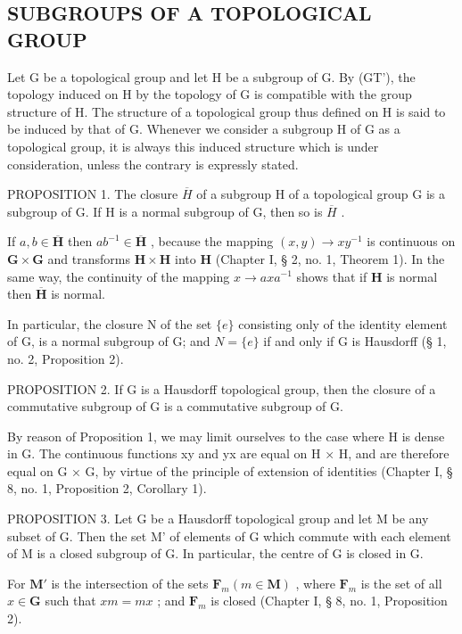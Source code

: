 \subsection{SUBGROUPS OF A TOPOLOGICAL GROUP}

Let G be a topological group and let H be a subgroup of G. By (GT'), the topology induced on H by the topology of G is compatible with the group structure of H. The structure of a topological group thus defined on H is said to be induced by that of G. Whenever we consider a subgroup H of G as a topological group, it is always this induced structure which is under consideration, unless the contrary is expressly stated.

PROPOSITION 1. The closure \(\overline{H}\) of a subgroup H of a topological group G is a subgroup of G. If H is a normal subgroup of G, then so is \(\overline{H}\) .

If \(a, b \in \overline{\mathbf{H}}\) then \(ab^{-1} \in \overline{\mathbf{H}}\) , because the mapping \((x, y) \to xy^{-1}\) is continuous on \(\mathbf{G} \times \mathbf{G}\) and transforms \(\mathbf{H} \times \mathbf{H}\) into \(\mathbf{H}\) (Chapter I, § 2, no. 1, Theorem 1). In the same way, the continuity of the mapping \(x \to axa^{-1}\) shows that if \(\mathbf{H}\) is normal then \(\overline{\mathbf{H}}\) is normal.

In particular, the closure N of the set \(\{e\}\) consisting only of the identity element of G, is a normal subgroup of G; and \(N=\{e\}\) if and only if G is Hausdorff (§ 1, no. 2, Proposition 2).

PROPOSITION 2. If G is a Hausdorff topological group, then the closure of a commutative subgroup of G is a commutative subgroup of G.

By reason of Proposition 1, we may limit ourselves to the case where H is dense in G. The continuous functions xy and yx are equal on H × H, and are therefore equal on G × G, by virtue of the principle of extension of identities (Chapter I, § 8, no. 1, Proposition 2, Corollary 1).

PROPOSITION 3. Let G be a Hausdorff topological group and let M be any subset of G. Then the set M' of elements of G which commute with each element of M is a closed subgroup of G. In particular, the centre of G is closed in G.

For \(\mathbf{M}'\) is the intersection of the sets \(\mathbf{F}_m(m \in \mathbf{M})\) , where \(\mathbf{F}_m\) is the set of all \(x \in \mathbf{G}\) such that \(xm = mx\) ; and \(\mathbf{F}_m\) is closed (Chapter I, § 8, no. 1, Proposition 2).

